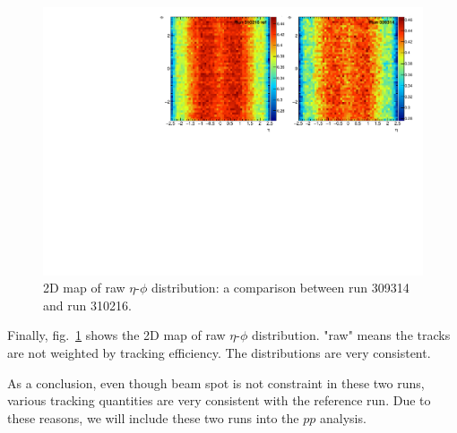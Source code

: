 \begin{figure}[H]
\centering
\includegraphics[width=0.9\linewidth]{figs/sec_evtSlc/GRLpp2016/309314_crr_eta_phi.pdf}
\caption{2D map of raw $\eta$-$\phi$ distribution: a comparison between run 309314 and run 310216.}
\label{fig:GRLpp2016_309314_eta_phi}
\end{figure}
Finally, fig.~\ref{fig:GRLpp2016_309314_eta_phi} shows the 2D map of raw $\eta$-$\phi$ distribution. "raw" means the tracks are not weighted by tracking efficiency. The distributions are very consistent.

As a conclusion, even though beam spot is not constraint in these two runs, various tracking quantities are very consistent with the reference run. Due to these reasons, we will include these two runs into the $pp$ analysis.




